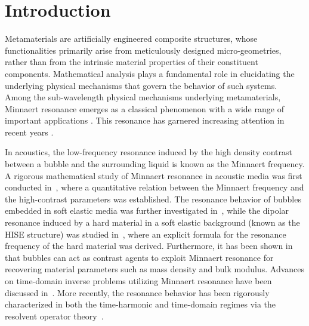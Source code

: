 \documentclass[11pt,reqno,twoside]{amsart}
\theoremstyle{definition}
\theoremstyle{remark}
\numberwithin{equation}{section}
\begin{document}
\section{Introduction}
Metamaterials are artificially engineered composite structures, whose functionalities primarily arise from meticulously designed micro-geometries, rather than from the intrinsic material properties of their constituent components. Mathematical analysis plays a fundamental role in elucidating the underlying physical mechanisms that govern the behavior of such systems.
Among the sub-wavelength physical mechanisms underlying metamaterials, Minnaert resonance emerges as a classical phenomenon with a wide range of important applications \cite{DAC, LBFWT, LSL}. This resonance has garnered increasing attention in recent years \cite{AFGLZ, HBD, HFL, HZ, HZ5}.



In acoustics, the low-frequency resonance induced by the high density contrast between a bubble and the surrounding liquid is known as the Minnaert frequency. A rigorous mathematical study of Minnaert resonance in acoustic media was first conducted in~\cite{AFGL}, where a quantitative relation between the Minnaert frequency and the high-contrast parameters was established. The resonance behavior of bubbles embedded in soft elastic media was further investigated in~\cite{HLIHJ}, while the dipolar resonance induced by a hard material in a soft elastic background (known as the HISE structure) was studied in~\cite{lizou}, where an explicit formula for the resonance frequency of the hard material was derived. Furthermore, it has been shown in~\cite{ACC, DGS} that bubbles can act as contrast agents to exploit Minnaert resonance for recovering material parameters such as mass density and bulk modulus. Advances on time-domain inverse problems utilizing Minnaert resonance have been discussed in~\cite{MMSi, MMSINI, SS23, SSW24}. More recently, the resonance behavior has been rigorously characterized in both the time-harmonic and time-domain regimes via the resolvent operator theory~\cite{LS241, LS24, MPS}.
\end{document}
